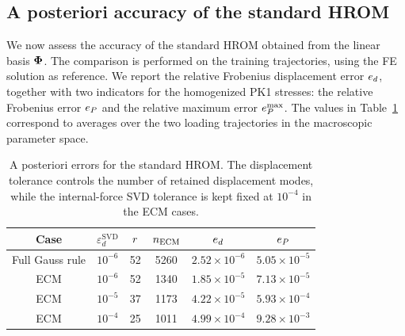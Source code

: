 \documentclass[11pt,a4paper]{article}
\newcommand{\PROMPT}[1]{ }
\begin{document}




\PROMPT{}


%
\subsection{A posteriori accuracy of the standard HROM}
\label{subsec:standard_HROM_accuracy}

We now assess the accuracy of the standard HROM obtained from the linear basis
$\bm{\Phi}$. The comparison is performed on the training trajectories, using the FE
solution as reference. We report the relative Frobenius displacement error
$e_d$, together with two indicators for the homogenized PK1 stresses:
the relative Frobenius error $e_P$ and the relative maximum error
$e_P^{\max}$. The values in Table~\ref{tab:standard_HROM_accuracy} correspond to
averages over the two loading trajectories in the macroscopic parameter space.

\begin{table}[H]
\centering
\caption{A posteriori errors for the standard HROM. The displacement tolerance
controls the number of retained displacement modes, while the internal-force
SVD tolerance is kept fixed at $10^{-4}$ in the ECM cases.}
\label{tab:standard_HROM_accuracy}
\begin{tabular}{cccccc}
\toprule
Case & $\varepsilon_d^{\mathrm{SVD}}$ & $r$ & $n_{\mathrm{ECM}}$ &
$e_d$ & $e_P$ \\
\midrule
Full Gauss rule & $10^{-6}$ & 52 & 5260 & $2.52\times 10^{-6}$ & $5.05\times 10^{-5}$ \\
ECM             & $10^{-6}$ & 52 & 1340 & $1.85\times 10^{-5}$ & $7.13\times 10^{-5}$ \\
ECM             & $10^{-5}$ & 37 & 1173 & $4.22\times 10^{-5}$ & $5.93\times 10^{-4}$ \\
ECM             & $10^{-4}$ & 25 & 1011 & $4.99\times 10^{-4}$ & $9.28\times 10^{-3}$ \\
\bottomrule
\end{tabular}
\end{table}
\end{document}
